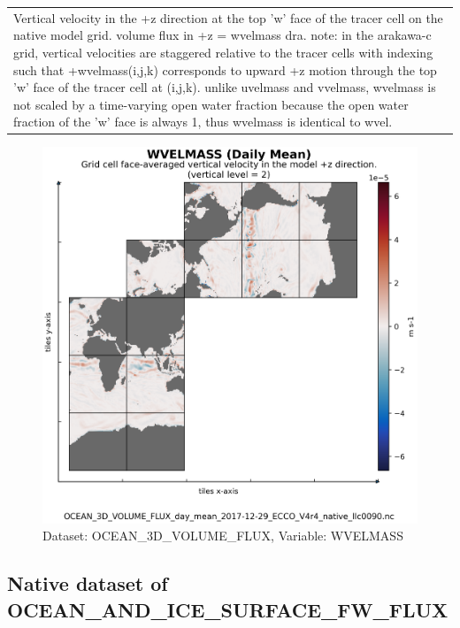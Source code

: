 \begin{longtable}{|m{}|m{}|m{}|m{}|}
\rowcolor{lightgray} \multicolumn{4}{|c|}{\textbf{Comments}} \\ \hline
\multicolumn{4}{|p{1\textwidth}|}{\footnotesize{{Vertical velocity in the +z direction at the top 'w' face of the tracer cell on the native model grid. volume flux in +z = wvelmass dra. note: in the arakawa-c grid, vertical velocities are staggered relative to the tracer cells with indexing such that +wvelmass(i,j,k) corresponds to upward +z motion through the top 'w' face of the tracer cell at (i,j,k). unlike uvelmass and vvelmass, wvelmass is not scaled by a time-varying open water fraction because the open water fraction of the 'w' face is always 1, thus wvelmass is identical to wvel.}}} \\ \hline
\end{longtable}

\begin{figure}[H]
\centering
\includegraphics[scale=0.55]{../images/plots/native_plots/Ocean_Three-Dimensional_Volume_Fluxes/WVELMASS.png}
\caption{Dataset: OCEAN\_3D\_VOLUME\_FLUX, Variable: WVELMASS}
\label{tab:table-OCEAN_3D_VOLUME_FLUX_WVELMASS-Plot}
\end{figure}
\newpage
\subsection{Native dataset of OCEAN\_AND\_ICE\_SURFACE\_FW\_FLUX}
\newp
